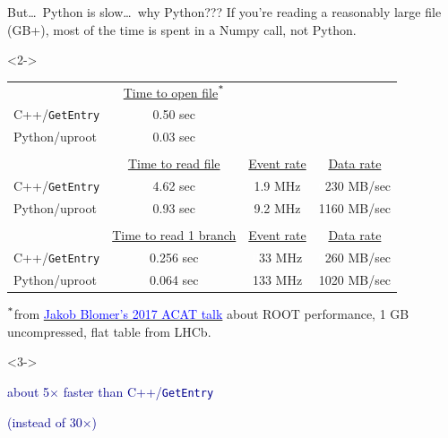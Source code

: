 \documentclass[aspectratio=169]{beamer}
\begin{document}
\begin{frame}{But\ldots\ Python is slow\ldots\ why Python???}
\vspace{0.4 cm}
{\large If you're reading a reasonably large file (GB+), most of the time is spent in a Numpy call, not Python.}

\vspace{0.3 cm}
\begin{uncoverenv}<2->
\begin{tabular}{l c c c}
& \underline{Time to open file}$^{\mbox{\scriptsize *}}$ & & \\
C++/{\tt GetEntry} & 0.50 sec & & \\
Python/uproot & 0.03 sec & & \\
& & & \\
 & \underline{Time to read file} & \underline{Event rate} & \underline{Data rate} \\
C++/{\tt GetEntry} & 4.62 sec & 1.9 MHz & \textcolor{white}{0}230 MB/sec \\
Python/uproot & 0.93 sec & 9.2 MHz & 1160 MB/sec \\
& & & \\
& \underline{Time to read 1 branch} & \underline{Event rate} & \underline{Data rate} \\
C++/{\tt GetEntry} & 0.256 sec & \textcolor{white}{0}33 MHz & \textcolor{white}{0}260 MB/sec \\
Python/uproot & 0.064 sec & 133 MHz & 1020 MB/sec
\end{tabular}

\vspace{0.5 cm}
{\scriptsize $^{\mbox{\scriptsize *}}$from \href{https://indico.cern.ch/event/567550/contributions/2628878/}{\textcolor{blue}{Jakob Blomer's 2017 ACAT talk}} about ROOT performance, 1 GB uncompressed, flat table from LHCb.}
\end{uncoverenv}

\vspace{-6.4 cm}\hfill\begin{minipage}{0.35\linewidth}
\begin{uncoverenv}<3->
\begin{center}
\large
\textcolor{darkblue}{about 5$\times$ faster than C++/{\tt GetEntry}}

\vspace{0.1 cm}
\textcolor{darkblue}{(instead of 30$\times$)}
\end{center}
\end{uncoverenv}
\vspace{6.4 cm}
\end{minipage}
\end{frame}
\end{document}
